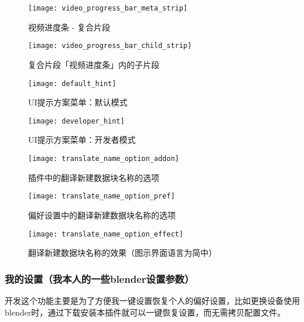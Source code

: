 \documentclass{../../public_resources/doc}
\begin{document}
\begin{figure}[h!]
    \begin{minipage}[t]{0.47\textwidth}
        \texttt{[image: video\_progress\_bar\_meta\_strip]}
        \caption{视频进度条 - 复合片段}
        \label{视频进度条复合片段}
    \end{minipage}
    \quad
    \begin{minipage}[t]{0.47\textwidth}
        \texttt{[image: video\_progress\_bar\_child\_strip]}
        \caption{复合片段「视频进度条」内的子片段}
        \label{视频进度条子片段}
    \end{minipage}

    \vspace{1ex}

    \begin{minipage}[t]{0.47\textwidth}
        \texttt{[image: default\_hint]}
        \caption{UI提示方案菜单：默认模式}
        \label{默认提示方案}
    \end{minipage}
    \quad
    \begin{minipage}[t]{0.47\textwidth}
        \texttt{[image: developer\_hint]}
        \caption{UI提示方案菜单：开发者模式}
        \label{开发者提示方案}
    \end{minipage}

    \vspace{1ex}

    \begin{minipage}[t]{0.45\textwidth}
        \texttt{[image: translate\_name\_option\_addon]}
        \caption{插件中的翻译新建数据块名称的选项}
        \label{插件的翻译名称选项}
    \end{minipage}
    \quad
    \begin{minipage}[t]{0.5\textwidth}
        \texttt{[image: translate\_name\_option\_pref]}
        \caption{偏好设置中的翻译新建数据块名称的选项}
        \label{偏好设置的的翻译名称选项}
    \end{minipage}
\end{figure}

\clearpage

\begin{figure}
    \texttt{[image: translate\_name\_option\_effect]}
    \caption{翻译新建数据块名称的效果（图示界面语言为简中）}
    \label{翻译名称的效果}
\end{figure}

\subsubsection{我的设置（我本人的一些blender设置参数）}
\hypertarget{MySettings}{}
开发这个功能主要是为了方便我一键设置恢复个人的偏好设置，比如更换设备使用blender时，通过下载安装本插件就可以一键恢复设置，而无需拷贝配置文件。
\end{document}
